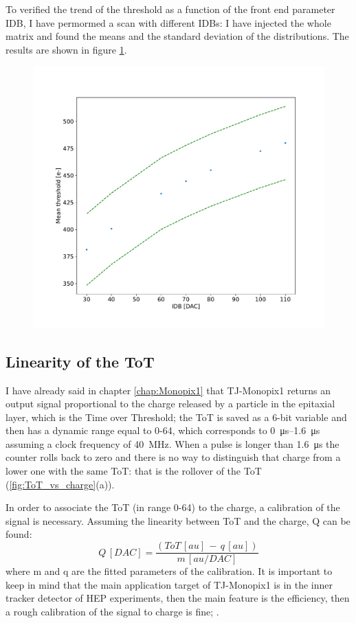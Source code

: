         To verified the trend of the threshold as a function of the front end parameter IDB, I have permormed a scan with different IDBs: I have injected the whole matrix and found the means and the standard deviation of the distributions. The results are shown in figure \ref{fig:threshold_vs_IDB}.
        \begin{figure}[h!]
            \centering
            \includegraphics[width=.70\linewidth]{figures/charaterization/thr_vs_IDB.pdf}
            \caption{}
            \label{fig:threshold_vs_IDB}
        \end{figure}            
   

    \subsection{Linearity of the ToT}    
        I have already said in chapter \ref{chap:Monopix1} that TJ-Monopix1 returns an output signal proportional to the charge released by a particle in the epitaxial layer, which is the Time over Threshold; the ToT is saved as a 6-bit variable and then has a dynamic range equal to 0-64, which corresponds to \SIrange{0}{1.6}{\us} assuming a clock frequency of \SI{40}{MHz}.
        When a pulse is longer than \SI{1.6}{\us} the counter rolls back to zero and there is no way to distinguish that charge from a lower one with the same ToT: that is the rollover of the ToT (\ref{fig:ToT_vs_charge}(a)).   

        In order to associate the ToT (in range 0-64) to the charge, a calibration of the signal is necessary. Assuming the linearity between ToT and the charge, Q can be found: 
        \begin{equation}
            Q\, [DAC] = \frac{(ToT\,[au]\, -\, q\,[au])}{m\, [au/DAC]} 
        \end{equation}
        where m and q are the fitted parameters of the calibration.
        It is important to keep in mind that the main application target of TJ-Monopix1 is in the inner tracker detector of HEP experiments, then the main feature is the efficiency, then a rough calibration of the signal to charge is fine; . 
        
